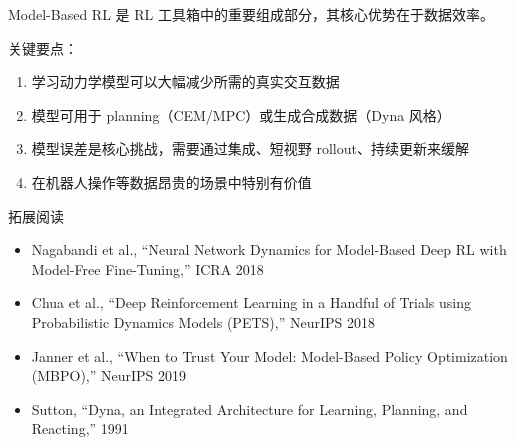 \documentclass[a4paper]{article}
\begin{document}
Model-Based RL 是 RL 工具箱中的重要组成部分，其核心优势在于数据效率。

关键要点：
\begin{enumerate}
    \item 学习动力学模型可以大幅减少所需的真实交互数据
    \item 模型可用于 planning（CEM/MPC）或生成合成数据（Dyna 风格）
    \item 模型误差是核心挑战，需要通过集成、短视野 rollout、持续更新来缓解
    \item 在机器人操作等数据昂贵的场景中特别有价值
\end{enumerate}

\begin{knowledgebox}{拓展阅读}
\begin{itemize}
    \item Nagabandi et al., ``Neural Network Dynamics for Model-Based Deep RL with Model-Free Fine-Tuning,'' ICRA 2018
    \item Chua et al., ``Deep Reinforcement Learning in a Handful of Trials using Probabilistic Dynamics Models (PETS),'' NeurIPS 2018
    \item Janner et al., ``When to Trust Your Model: Model-Based Policy Optimization (MBPO),'' NeurIPS 2019
    \item Sutton, ``Dyna, an Integrated Architecture for Learning, Planning, and Reacting,'' 1991
\end{itemize}
\end{knowledgebox}
\end{document}
